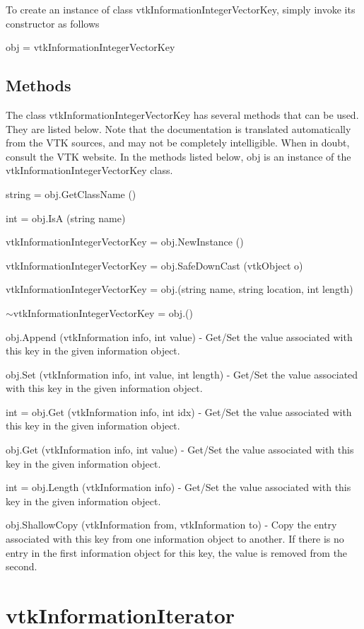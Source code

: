 To create an instance of class vtk\-Information\-Integer\-Vector\-Key, simply invoke its constructor as follows \begin{DoxyVerb}  obj = vtkInformationIntegerVectorKey
\end{DoxyVerb}
 \hypertarget{vtkwidgets_vtkxyplotwidget_Methods}{}\subsection{Methods}\label{vtkwidgets_vtkxyplotwidget_Methods}
The class vtk\-Information\-Integer\-Vector\-Key has several methods that can be used. They are listed below. Note that the documentation is translated automatically from the V\-T\-K sources, and may not be completely intelligible. When in doubt, consult the V\-T\-K website. In the methods listed below, {\ttfamily obj} is an instance of the vtk\-Information\-Integer\-Vector\-Key class. 
\begin{DoxyItemize}
\item {\ttfamily string = obj.\-Get\-Class\-Name ()}  
\item {\ttfamily int = obj.\-Is\-A (string name)}  
\item {\ttfamily vtk\-Information\-Integer\-Vector\-Key = obj.\-New\-Instance ()}  
\item {\ttfamily vtk\-Information\-Integer\-Vector\-Key = obj.\-Safe\-Down\-Cast (vtk\-Object o)}  
\item {\ttfamily vtk\-Information\-Integer\-Vector\-Key = obj.(string name, string location, int length)}  
\item {\ttfamily $\sim$vtk\-Information\-Integer\-Vector\-Key = obj.()}  
\item {\ttfamily obj.\-Append (vtk\-Information info, int value)} -\/ Get/\-Set the value associated with this key in the given information object.  
\item {\ttfamily obj.\-Set (vtk\-Information info, int value, int length)} -\/ Get/\-Set the value associated with this key in the given information object.  
\item {\ttfamily int = obj.\-Get (vtk\-Information info, int idx)} -\/ Get/\-Set the value associated with this key in the given information object.  
\item {\ttfamily obj.\-Get (vtk\-Information info, int value)} -\/ Get/\-Set the value associated with this key in the given information object.  
\item {\ttfamily int = obj.\-Length (vtk\-Information info)} -\/ Get/\-Set the value associated with this key in the given information object.  
\item {\ttfamily obj.\-Shallow\-Copy (vtk\-Information from, vtk\-Information to)} -\/ Copy the entry associated with this key from one information object to another. If there is no entry in the first information object for this key, the value is removed from the second.  
\end{DoxyItemize}\hypertarget{vtkcommon_vtkinformationiterator}{}\section{vtk\-Information\-Iterator}\label{vtkcommon_vtkinformationiterator}
